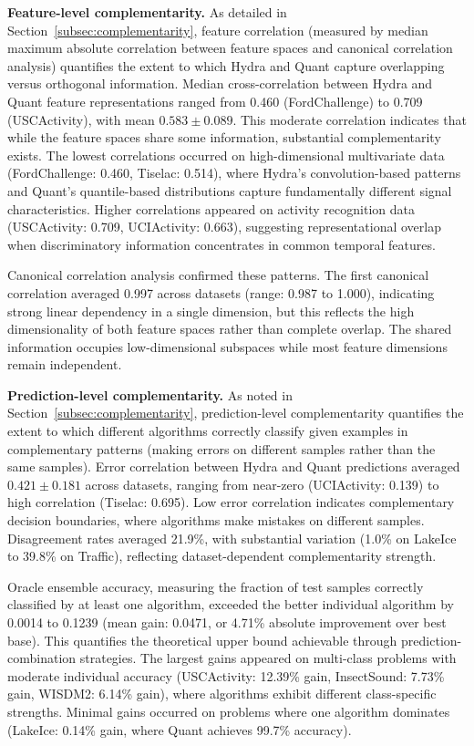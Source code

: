 \documentclass[pdflatex,sn-basic]{sn-jnl}           %
\theoremstyle{thmstyleone}%
\theoremstyle{thmstyletwo}%
\theoremstyle{thmstylethree}%
\begin{document}
\textbf{Feature-level complementarity.} As detailed in Section~\ref{subsec:complementarity}, feature correlation (measured by median maximum absolute correlation between feature spaces and canonical correlation analysis) quantifies the extent to which Hydra and Quant capture overlapping versus orthogonal information. Median cross-correlation between Hydra and Quant feature representations ranged from 0.460 (FordChallenge) to 0.709 (USCActivity), with mean $0.583 \pm 0.089$. This moderate correlation indicates that while the feature spaces share some information, substantial complementarity exists. The lowest correlations occurred on high-dimensional multivariate data (FordChallenge: 0.460, Tiselac: 0.514), where Hydra's convolution-based patterns and Quant's quantile-based distributions capture fundamentally different signal characteristics. Higher correlations appeared on activity recognition data (USCActivity: 0.709, UCIActivity: 0.663), suggesting representational overlap when discriminatory information concentrates in common temporal features.

Canonical correlation analysis confirmed these patterns. The first canonical correlation averaged 0.997 across datasets (range: 0.987 to 1.000), indicating strong linear dependency in a single dimension, but this reflects the high dimensionality of both feature spaces rather than complete overlap. The shared information occupies low-dimensional subspaces while most feature dimensions remain independent.

\textbf{Prediction-level complementarity.} As noted in Section~\ref{subsec:complementarity}, prediction-level complementarity quantifies the extent to which different algorithms correctly classify given examples in complementary patterns (making errors on different samples rather than the same samples). Error correlation between Hydra and Quant predictions averaged $0.421 \pm 0.181$ across datasets, ranging from near-zero (UCIActivity: 0.139) to high correlation (Tiselac: 0.695). Low error correlation indicates complementary decision boundaries, where algorithms make mistakes on different samples. Disagreement rates averaged 21.9\%, with substantial variation (1.0\% on LakeIce to 39.8\% on Traffic), reflecting dataset-dependent complementarity strength.

Oracle ensemble accuracy, measuring the fraction of test samples correctly classified by at least one algorithm, exceeded the better individual algorithm by 0.0014 to 0.1239 (mean gain: 0.0471, or 4.71\% absolute improvement over best base). This quantifies the theoretical upper bound achievable through prediction-combination strategies. The largest gains appeared on multi-class problems with moderate individual accuracy (USCActivity: 12.39\% gain, InsectSound: 7.73\% gain, WISDM2: 6.14\% gain), where algorithms exhibit different class-specific strengths. Minimal gains occurred on problems where one algorithm dominates (LakeIce: 0.14\% gain, where Quant achieves 99.7\% accuracy).
\end{document}
